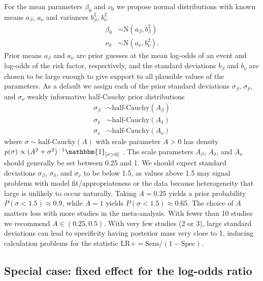 \documentclass[AMA,STIX1COL]{WileyNJD-v2}
\begin{document}
For the mean parameters $\beta_0$ and $\nu_0$ we propose normal distributions with known means $a_{\beta}$, $a_{\nu}$ and variances $b_{\beta}^2$, $b_{\nu}^2$
\begin{align}
\beta_0 &\sim \mbox{N}(a_\beta, b_\beta^2) \label{eq:beta0} \\
\nu_0 &\sim \mbox{N}(a_\nu, b_\nu^2). \label{eq:nu0}
\end{align}
\noindent Prior means $a_\beta$ and $a_\nu$ are prior guesses at the mean log-odds of an event and log-odds of the risk factor, respectively, and the standard deviations $b_\beta$ and $b_\nu$ are chosen to be large enough to give support to all plausible values of the parameters. As a default we assign each of the prior standard deviations $\sigma_\beta$, $\sigma_\delta$, and $\sigma_\nu$ weakly informative half-Cauchy prior distributions
\begin{align}
\sigma_\beta &\sim \mbox{half-Cauchy}(A_\beta) \label{eq:sigmabeta} \\
\sigma_\delta &\sim \mbox{half-Cauchy}(A_\delta) \label{eq:sigmadelta} \\
\sigma_\nu &\sim \mbox{half-Cauchy}(A_\nu) \label{eq:sigmanu}
\end{align}
where $\sigma \sim \mbox{half-Cauchy}(A)$ with scale parameter $A > 0$ has density $p(\sigma) \propto (A^2 + \sigma^2)^{-1} \mathbbm{1}_{[\sigma > 0]}$ \cite{gelman2006prior}. The scale parameters $A_\beta$, $A_\delta$, and $A_\nu$ should generally be set between 0.25 and 1. We should expect standard deviations $\sigma_\beta$, $\sigma_\delta$, and $\sigma_\nu$ to be below 1.5, as values above 1.5 may signal problems with model fit/appropriateness or the data because heterogeneity that large is unlikely to occur naturally. Taking $A = 0.25$ yields a prior probability $P(\sigma < 1.5) \approx 0.9$, while $A = 1$ yields $P(\sigma < 1.5) \approx 0.65$. The choice of $A$ matters less with more studies in the meta-analysis. With fewer than 10 studies we recommend $A \in (0.25, 0.5)$. With very few studies (2 or 3), large standard deviations can lead to specificity having posterior mass very close to 1, inducing calculation problems for the statistic $\mbox{LR}+ = \text{Sens} / (1 - \text{Spec})$.

\subsection{Special case: fixed effect for the log-odds ratio}
\end{document}
